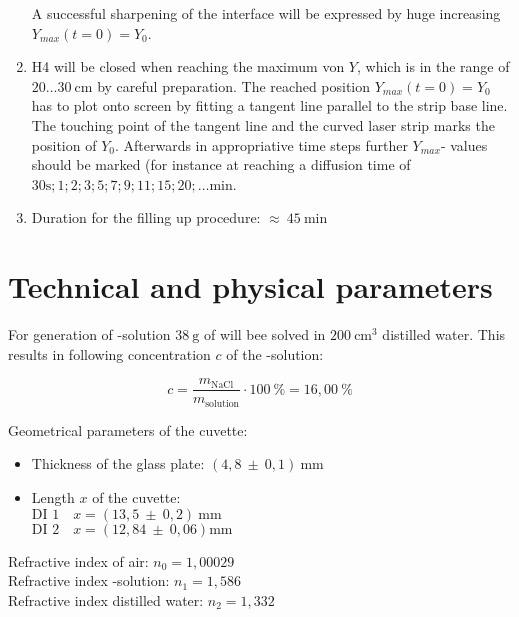 \documentclass[platz]{tudphygp_eng}
\begin{document}
\begin{enumerate}
A successful sharpening of the interface will be expressed by huge increasing $Y_{max}(t=0)=Y_0$.     
 \item H4 will be closed when reaching the maximum von $Y$, which is in the range of $20 \ldots 30 ~ \mathrm{cm}$ by careful preparation. The reached position $Y_{max}(t=0)=Y_0$ has to plot onto screen by fitting a tangent line parallel to the strip base line. The touching point of the tangent line and the curved laser strip marks the position of $Y_0$.
Afterwards in appropriative time steps further $Y_{max}$- values should be marked (for instance at reaching a diffusion time of $30\mathrm{s};1;2;3;5;7;9;11;15;20; \ldots \mathrm{min}$.
 
 \item Duration for the filling up procedure: $\approx ~ 45 ~ \mathrm{min}$
\end{enumerate}

\section*{ Technical and physical parameters}

For generation of -solution $38~\mathrm{g}$ of  will bee solved in $200~\mathrm{cm}^3$ distilled water. This results in following concentration $c$ of the -solution:

\begin{equation*}
 c = \frac{m_{\mathrm{NaCl}}}{m_{\mathrm{solution}}} \cdot 100 ~ \% = 16,00 ~ \%
\end{equation*}

Geometrical parameters of the cuvette:

\begin{itemize}
 \item Thickness of the glass plate: $(4,8~\pm~0,1) ~ \mathrm{mm}$
 \item Length $x$ of the cuvette:\\
 $\mbox{DI 1} \quad x = (13,5 ~\pm~ 0,2) ~ \mathrm{mm}$\\
 $\mbox{DI 2} \quad x = (12,84 ~\pm~ 0,06) \mathrm{mm}	$
\end{itemize}

Refractive index of air: $n_0 =1,00029$ \\
Refractive index -solution: $n_1=1,586$ \\
Refractive index distilled water: $n_2=1,332$
\end{document}
